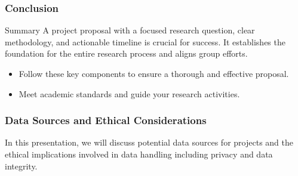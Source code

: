 \documentclass[aspectratio=169]{beamer}
\begin{document}
\begin{frame}[fragile]
    \frametitle{Conclusion}
    \begin{block}{Summary}
        A project proposal with a focused research question, clear methodology, and actionable timeline is crucial for success. 
        It establishes the foundation for the entire research process and aligns group efforts.
    \end{block}
    \begin{itemize}
        \item Follow these key components to ensure a thorough and effective proposal.
        \item Meet academic standards and guide your research activities.
    \end{itemize}
\end{frame}

\begin{frame}[fragile]
    \frametitle{Data Sources and Ethical Considerations}
    In this presentation, we will discuss potential data sources for projects and the ethical implications involved in data handling including privacy and data integrity.
\end{frame}
\end{document}
